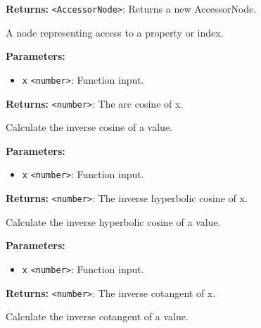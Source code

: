 \documentclass[12pt,a4paper]{article}
\begin{document}
\noindent \textbf{Returns:} \texttt{<AccessorNode>}: Returns a new AccessorNode.

\noindent A node representing access to a property or index.

\vspace{5mm}
\noindent {}


\noindent \textbf{Parameters:}
\begin{itemize}
  \item \texttt{x} \texttt{<number>}: Function input.
\end{itemize}

\noindent \textbf{Returns:} \texttt{<number>}: The arc cosine of \textasciigrave{}x\textasciigrave{}.

\noindent Calculate the inverse cosine of a value.

\vspace{5mm}
\noindent {}


\noindent \textbf{Parameters:}
\begin{itemize}
  \item \texttt{x} \texttt{<number>}: Function input.
\end{itemize}

\noindent \textbf{Returns:} \texttt{<number>}: The inverse hyperbolic cosine of \textasciigrave{}x\textasciigrave{}.

\noindent Calculate the inverse hyperbolic cosine of a value.

\vspace{5mm}
\noindent {}


\noindent \textbf{Parameters:}
\begin{itemize}
  \item \texttt{x} \texttt{<number>}: Function input.
\end{itemize}

\noindent \textbf{Returns:} \texttt{<number>}: The inverse cotangent of \textasciigrave{}x\textasciigrave{}.

\noindent Calculate the inverse cotangent of a value.

\vspace{5mm}
\noindent {}
\end{document}
